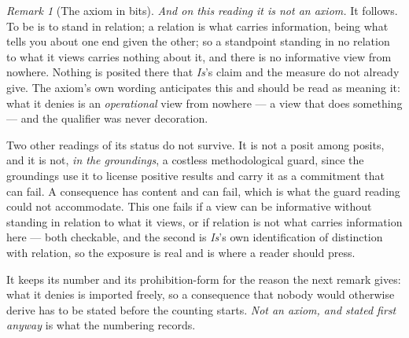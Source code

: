 \documentclass[11pt,a4paper]{article}
\theoremstyle{remark}\newtheorem{remark}[definition]{Remark}
\begin{document}
\begin{remark}[The axiom in bits]
\emph{And on this reading it is not an axiom.} It follows. To be is to stand in relation; a relation is
what carries information, being what tells you about one end given the other; so a standpoint standing
in no relation to what it views carries nothing about it, and there is no informative view from
nowhere. Nothing is posited there that \emph{Is}'s claim and the measure do not already give. The
axiom's own wording anticipates this and should be read as meaning it: what it denies is an
\emph{operational} view from nowhere --- a view that does something --- and the qualifier was never
decoration.

Two other readings of its status do not survive. It is not a posit among posits, and it is not, \emph{in the groundings}, a costless methodological guard, since the groundings use it to
license positive results and carry it as a commitment that can fail. A consequence has content and can
fail, which is what the guard reading could not accommodate. This one fails if a view can be
informative without standing in relation to what it views, or if relation is not what carries
information here --- both checkable, and the second is \emph{Is}'s own identification of
distinction with relation, so the exposure is real and is where a reader should press.

It keeps its number and its prohibition-form for the reason the next remark gives: what it denies is
imported freely, so a consequence that nobody would otherwise derive has to be stated before the
counting starts. \emph{Not an axiom, and stated first anyway} is what the numbering records.
\end{remark}
\end{document}
